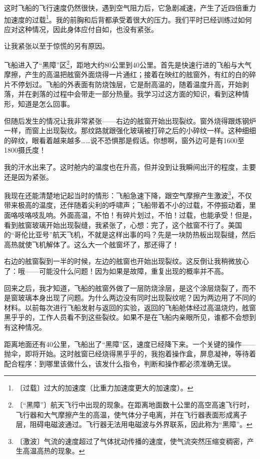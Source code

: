 \documentclass[12pt,UTF-8,openany]{ctexbook}
\begin{document}
\begin{normalsize}
    这时飞船的飞行速度仍然很快，遇到空气阻力后，它急剧减速，产生了近四倍重力加速度的过载\footnote{〔过载〕过大的加速度（比重力加速度更大的加速度）。}。我的前胸和后背都承受着很大的压力。我们平时已经训练过如何应对这种情况，因此身体应付自如，也没有紧张。
    
    让我紧张以至于惊慌的另有原因。
    
    飞船进入了“黑障”区\footnote{〔“黑障”〕航天飞行中出现的现象。在距离地面数十公里的高空高速飞行时，飞行器和大气摩擦产生的高温，使气体分子电离，并在飞行器表面形成离子层，阻碍电磁波通过。飞行器无法用电磁波与外界联系，因此称为“黑障”。}，距地大约80公里到40公里。首先是快速行进的飞船与大气摩擦，产生的高温把舷窗外面烧得一片通红；接着在映红的舷窗外，有红的白的碎片不停划过。飞船的外表面有防烧蚀层，它是耐高温的，随着温度升高，开始剥落，并在剥落的过程中会带走一部分热量。我学习过这方面的知识，看到这种情形，知道是怎么回事。
    
    但随后发生的情况让我非常紧张——右边的舷窗开始出现裂纹。窗外烧得跟炼钢炉一样，而窗上出现裂纹。那纹路就跟强化玻璃被打碎之后的小碎纹一样。这种细细的碎纹，眼看着越来越多……说不恐惧那是假话。你想啊，窗外边可是有1600至1800摄氏度！
    
    我的汗水出来了。这时舱内的温度也在升高，但并没到让我瞬间出汗的程度，主要还是因为紧张。
    
    我现在还能清楚地记起当时的情形：飞船急速下降，跟空气摩擦产生激波\footnote{〔激波〕气流的速度超过了气体扰动传播的速度，使气流突然压缩变稠密，产生高温高热的现象。}，不仅带来极高的温度，还伴随着尖利的呼啸声；飞船带着不小的过载，不停振动着，里面咯吱咯吱乱响。外面高温，不怕！有碎片划过，不怕！过载，也能承受！但是，看到舷窗玻璃开始出现裂缝，我紧张了，心想：完了，这个舷窗不行了。美国的“哥伦比亚号”航天飞机，不就是这样出事的吗？先是一块防热板出现裂缝，然后高热就使飞机解体了。这么大一个舷窗坏了，那还得了！
    
    右边的舷窗裂到一半的时候，左边的舷窗也开始出现裂纹。这反倒让我稍微放心了：哦——可能没什么问题！因为如果是故障，重复出现的概率并不高。
    
    回来之后，我才知道，飞船的舷窗外做了一层防烧涂层，是这个涂层烧裂了，而不是窗玻璃本身出现了问题。为什么两边没有同时出现裂纹呢？因为两边用了不同的材料。以前每次进行飞船发射与返回的实验，返回的飞船舱体经过高温烧灼，舷窗黑乎乎的，工作人员看不到这些裂纹。如果不是在飞船内亲眼所见，谁都不会想到有这种情况。
    
    距离地面还有40公里，飞船出了“黑障”区，速度已经降下来。一个关键的操作——抛伞，即将开始。这时舷窗已经烧得黑乎乎的，我抱着操作盒，屏息凝神，等待着配合程序：到哪里该做什么，该发什么指令，判断和操作都必须准确无误。
    

\end{normalsize}
\end{document}
